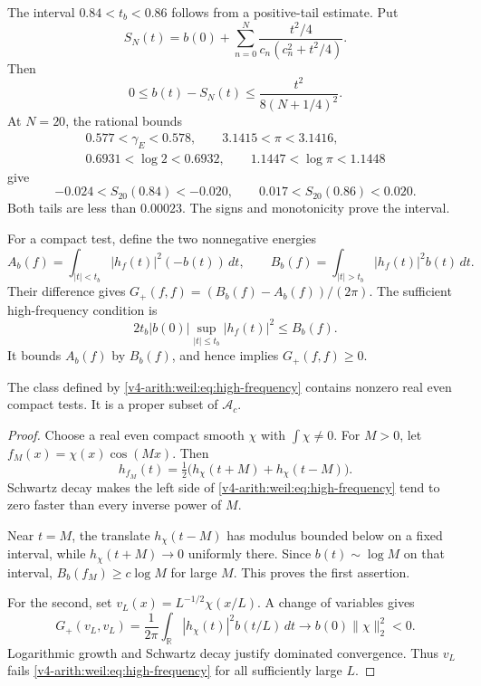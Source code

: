 The interval \(0.84<t_b<0.86\) follows from a positive-tail estimate.
Put
\[
 S_N(t)=b(0)+\sum_{n=0}^N
          \frac{t^2/4}{c_n(c_n^2+t^2/4)}.
\]
Then
\[
 0\le b(t)-S_N(t)\le\frac{t^2}{8(N+1/4)^2}.
\]
At \(N=20\), the rational bounds
\[
 \begin{gathered}
 0.577<\gamma_E<0.578,\qquad3.1415<\pi<3.1416,\\
 0.6931<\log2<0.6932,\qquad1.1447<\log\pi<1.1448
 \end{gathered}
\]
give
\[
 -0.024<S_{20}(0.84)<-0.020,\qquad
 0.017<S_{20}(0.86)<0.020.
\]
Both tails are less than \(0.00023\). The signs and monotonicity
prove the interval.

For a compact test, define the two nonnegative energies
\[
 A_b(f)=\int_{|t|<t_b}|h_f(t)|^2(-b(t))\,dt,\qquad
 B_b(f)=\int_{|t|>t_b}|h_f(t)|^2b(t)\,dt.
\]
Their difference gives \(G_+(f,f)=(B_b(f)-A_b(f))/(2\pi)\).
The sufficient high-frequency condition is
\begin{equation}
 2t_b|b(0)|\sup_{|t|\le t_b}|h_f(t)|^2\le B_b(f).
 \label{v4-arith:weil:eq:high-frequency}
\end{equation}
It bounds \(A_b(f)\) by \(B_b(f)\), and hence implies \(G_+(f,f)\ge0\).

\begin{proposition}
\label{v4-arith:weil:prop:high-frequency}
The class defined by \eqref{v4-arith:weil:eq:high-frequency} contains
nonzero real even compact tests. It is a proper subset of
\(\mathscr A_c\).
\end{proposition}
\begin{proof}
Choose a real even compact smooth \(\chi\) with \(\int\chi\ne0\).
For \(M>0\), let \(f_M(x)=\chi(x)\cos(Mx)\).
Then
\[
 h_{f_M}(t)=\tfrac12\bigl(h_\chi(t+M)+h_\chi(t-M)\bigr).
\]
Schwartz decay makes the left side of
\eqref{v4-arith:weil:eq:high-frequency} tend to zero faster than
every inverse power of \(M\).

Near \(t=M\), the translate \(h_\chi(t-M)\) has modulus bounded below
on a fixed interval, while \(h_\chi(t+M)\to0\) uniformly there.
Since \(b(t)\sim\log M\) on that interval, \(B_b(f_M)\ge c\log M\)
for large \(M\). This proves the first assertion.

For the second, set \(v_L(x)=L^{-1/2}\chi(x/L)\).
A change of variables gives
\[
 G_+(v_L,v_L)=\frac1{2\pi}\int_{\mathbb R}
              |h_\chi(t)|^2b(t/L)\,dt
         \longrightarrow b(0)\|\chi\|_2^2<0.
\]
Logarithmic growth and Schwartz decay justify dominated convergence.
Thus \(v_L\) fails \eqref{v4-arith:weil:eq:high-frequency}
for all sufficiently large \(L\).
\end{proof}

